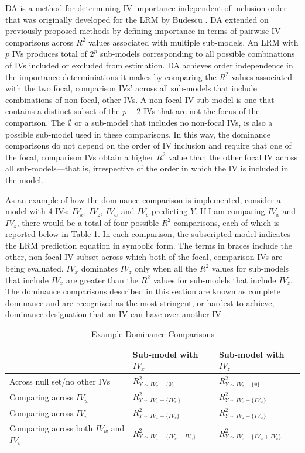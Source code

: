 \documentclass[man]{apa7}
\begin{document}
	DA is a method for determining IV importance independent of inclusion order that was originally developed for the LRM by Budescu \parencite*{budescu1993dominance}.
	DA extended on previously proposed methods by defining importance in terms of pairwise IV comparisons across $R^2$ values associated with multiple sub-models.
	An LRM with $p$ IVs produces total of $2^p$ sub-models corresponding to all possible combinations of IVs included or excluded from estimation.
	DA achieves order independence in the importance determiniations it makes by comparing the $R^2$ values associated with the two focal, comparison IVs' across all sub-models that include combinations of non-focal, other IVs. 
	A non-focal IV sub-model is one that contains a distinct subset of the $p - 2$ IVs that are not the focus of the comparison.
	The $\emptyset$ or a sub-model that includes no non-focal IVs, is also a possible sub-model used in these comparisons.	
	In this way, the dominance comparisons do not depend on the order of IV inclusion and require that one of the focal, comparison IVs obtain a higher $R^2$ value than the other focal IV across all sub-models---that is, irrespective of the order in which the IV is included in the model.
	
	As an example of how the dominance comparison is implemented, consider a model with 4 IVs: $IV_x$, $IV_z$, $IV_w$ and $IV_v$ predicting $Y$.
	If I am comparing $IV_x$ and $IV_z$, there would be a total of four possible $R^2$ comparisons, each of which is reported below in Table \ref{tab:exdom}.
	In each comparison, the subscripted model indicates the LRM prediction equation in symbolic form.
	The terms in braces include the other, non-focal IV subset across which both of the focal, comparison IVs are being evaluated.
	$IV_x$ dominates $IV_z$ only when all the $R^2$ values for sub-models that include $IV_x$ are greater than the $R^2$ values for sub-models that include $IV_z$.
	The dominance comparisons described in this section are known as complete dominance and are recognized as the most stringent, or hardest to achieve, dominance designation that an IV can have over another IV \parencite{azen2003dominance}.	

		\begin{table}[h!]
			\centering
			\caption{\centering Example Dominance Comparisons}
			\begin{tabular}{ l | l l }
				
				& Sub-model with $IV_x$ & Sub-model with $IV_z$ \\
				\hline
				Across null set/no other IVs & $R^2_{Y \sim IV_x + \{\emptyset\}}$ & $R^2_{Y \sim IV_z+ \{\emptyset\} }$ \\
				Comparing across $IV_w$ & $R^2_{Y \sim IV_x + \{IV_w\}}$ & $R^2_{Y \sim IV_z + \{IV_w\}}$ \\
				Comparing across $IV_v$ & $R^2_{Y \sim IV_x + \{IV_v\}}$ & $R^2_{Y \sim IV_z + \{IV_w\}}$ \\
				Comparing across both $IV_w$ and $IV_v$ & $R^2_{Y \sim IV_x + \{IV_w + IV_v\}}$ & $R^2_{Y \sim IV_z + \{IV_w + IV_v\}}$ \\
				\hline
		\end{tabular}
		\label{tab:exdom}
	\end{table}
	
\end{document}
